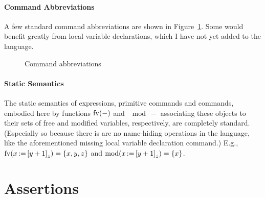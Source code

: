 \documentclass[11pt]{article}
\begin{document}
\paragraph{Command Abbreviations} A few standard command abbreviations are shown in Figure~\ref{fig:command-abbreviations}. Some would benefit greatly from local variable declarations, which I have not yet added to the language. 

\begin{figure}[ht]
	\centering
	\caption{\label{fig:command-abbreviations} Command abbreviations}
\end{figure}

\paragraph{Static Semantics} The static semantics of expressions, primitive commands and commands, embodied here by functions $\mathrm{fv}(-)$ and $\mod{-}$ associating these objects to their sets of free and modified variables, respectively, are completely standard. (Especially so because there is are no name-hiding operations in the language, like the aforementioned missing local variable declaration command.) E.g., $\mathrm{fv}(x \operatorname{:\!=} \left[ y+1 \right]_z) = \left\lbrace x,y,z \right\rbrace$ and $\mathrm{mod}(x \operatorname{:\!=} \left[ y+1 \right]_z) = \left\lbrace x \right\rbrace$.  

\section{Assertions}
\label{sec:assertions}
\end{document}
